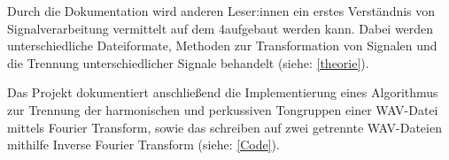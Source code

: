 \par

Durch die Dokumentation wird anderen Leser:innen ein erstes Verständnis von Signalverarbeitung vermittelt auf dem 4aufgebaut werden kann.
Dabei werden unterschiedliche Dateiformate, Methoden zur Transformation von Signalen und die Trennung unterschiedlicher Signale behandelt (siehe: \cref{theorie}).

\par

Das Projekt dokumentiert anschließend die Implementierung eines Algorithmus zur Trennung der harmonischen und perkussiven Tongruppen einer WAV-Datei mittels Fourier Transform, sowie das schreiben auf zwei getrennte WAV-Dateien mithilfe Inverse Fourier Transform (siehe: \cref{Code}).